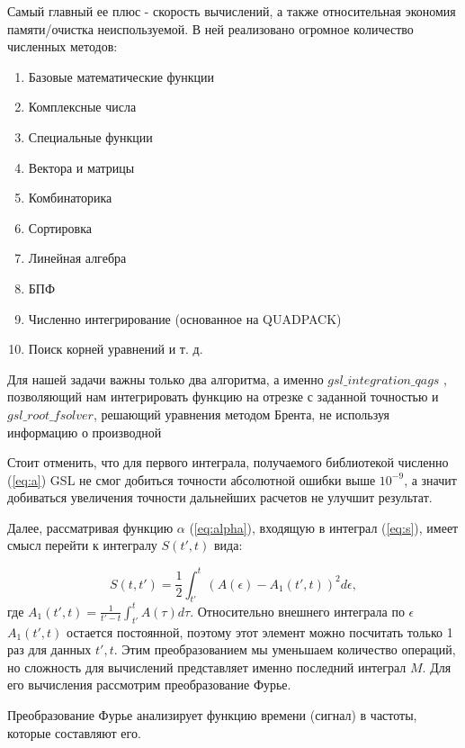 \documentclass[14pt]{article}
\numberwithin{figure}{section}
\numberwithin{equation}{section}
\begin{document}
Самый главный ее плюс - скорость вычислений, а также относительная экономия памяти/очистка неиспользуемой. В ней реализовано огромное количество численных методов:

\begin{enumerate} 
	\item Базовые математические функции
	\item Комплексные числа
	\item Специальные функции
	\item Вектора и матрицы
	\item Комбинаторика
	\item Сортировка
	\item Линейная алгебра
	\item БПФ
	\item Численно интегрирование (основанное на QUADPACK)
	\item Поиск корней уравнений и т. д.
\end{enumerate}

Для нашей задачи важны только два алгоритма, а именно $gsl\_integration\_qags$ \cite{gsl:website2}, позволяющий нам интегрировать функцию на отрезке с заданной точностью и $gsl\_root\_fsolver$, решающий уравнения методом Брента, не используя информацию о производной \cite{gsl:website}

Стоит отменить, что для первого интеграла, получаемого библиотекой численно (\ref{eq:a}) GSL не смог добиться точности абсолютной ошибки выше $10^{-9}$, а значит добиваться увеличения точности дальнейших расчетов не улучшит результат.

Далее, рассматривая функцию $\alpha$ (\ref{eq:alpha}), входящую в интеграл (\ref{eq:s}), имеет смысл перейти к интегралу $S(t', t)$ вида:

\begin{equation}\label{eq:s_integrate2}
S(t, t') = \frac{1}{2}\int_{t'}^{t} \left( A(\epsilon) - A_1(t', t) \right)^2 d\epsilon,
\end{equation}
где $A_1(t', t) = \frac{1}{t'-t}\int_{t'}^{t}A(\tau) d\tau$. Относительно внешнего интеграла по $\epsilon$ $A_1(t', t)$ остается постоянной, поэтому этот элемент можно посчитать только 1 раз для данных $t' ,t$. Этим преобразованием мы уменьшаем количество операций, но сложность для вычислений представляет именно последний интеграл $M$. Для его вычисления рассмотрим преобразование Фурье.

Преобразование Фурье анализирует функцию времени (сигнал) в частоты, которые составляют его.
\end{document}
